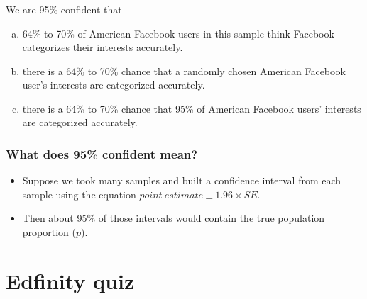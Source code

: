 \documentclass[t,compress,mathserif]{beamer}
\begin{document}

\begin{frame}
\frametitle{}


We are 95\% confident that
\begin{enumerate}[(a)]
\item 64\% to 70\% of American Facebook users in this sample think Facebook categorizes their interests accurately.
\item there is a 64\% to 70\% chance that a randomly chosen American Facebook user's interests are categorized accurately.
\item there is a 64\% to 70\% chance that 95\% of American Facebook users' interests are categorized accurately.
\end{enumerate}

\end{frame}


\begin{frame}
\frametitle{What does 95\% confident mean?}

\begin{itemize}

\item Suppose we took many samples and built a confidence interval from each sample using the equation $point~estimate \pm 1.96 \times SE$.

\item Then about 95\% of those intervals would contain the true population proportion ($p$). 

\end{itemize}

\end{frame}


\section{Edfinity quiz}

\end{document}
